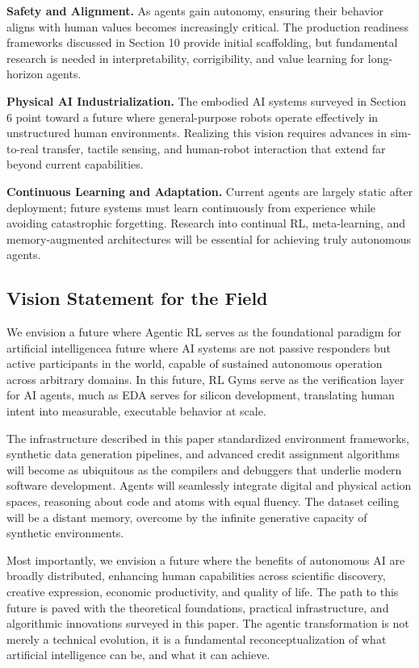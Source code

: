 \textbf{Safety and Alignment.} As agents gain autonomy, ensuring their behavior aligns with human values becomes increasingly critical. The production readiness frameworks discussed in Section 10 provide initial scaffolding, but fundamental research is needed in interpretability, corrigibility, and value learning for long-horizon agents.

\textbf{Physical AI Industrialization.} The embodied AI systems surveyed in Section 6 point toward a future where general-purpose robots operate effectively in unstructured human environments. Realizing this vision requires advances in sim-to-real transfer, tactile sensing, and human-robot interaction that extend far beyond current capabilities.

\textbf{Continuous Learning and Adaptation.} Current agents are largely static after deployment; future systems must learn continuously from experience while avoiding catastrophic forgetting. Research into continual RL, meta-learning, and memory-augmented architectures will be essential for achieving truly autonomous agents.

\subsection{Vision Statement for the Field}

We envision a future where Agentic RL serves as the foundational paradigm for artificial intelligencea future where AI systems are not passive responders but active participants in the world, capable of sustained autonomous operation across arbitrary domains. In this future, RL Gyms serve as the verification layer for AI agents, much as EDA serves for silicon development, translating human intent into measurable, executable behavior at scale.

The infrastructure described in this paper standardized environment frameworks, synthetic data generation pipelines, and advanced credit assignment algorithms will become as ubiquitous as the compilers and debuggers that underlie modern software development. Agents will seamlessly integrate digital and physical action spaces, reasoning about code and atoms with equal fluency. The dataset ceiling will be a distant memory, overcome by the infinite generative capacity of synthetic environments.

Most importantly, we envision a future where the benefits of autonomous AI are broadly distributed, enhancing human capabilities across scientific discovery, creative expression, economic productivity, and quality of life. The path to this future is paved with the theoretical foundations, practical infrastructure, and algorithmic innovations surveyed in this paper. The agentic transformation is not merely a technical evolution, it is a fundamental reconceptualization of what artificial intelligence can be, and what it can achieve.

